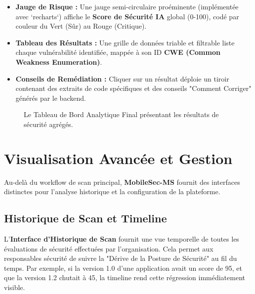 \documentclass[
  journal=largetwo,
  manuscript=article-type,
  year=2025,
  volume=1,
]{cup-journal}
\begin{document}
\begin{itemize}
    \item \textbf{Jauge de Risque :} Une jauge semi-circulaire proéminente (implémentée avec `recharts`) affiche le \textbf{Score de Sécurité IA} global (0-100), codé par couleur du Vert (Sûr) au Rouge (Critique).
    \item \textbf{Tableau des Résultats :} Une grille de données triable et filtrable liste chaque vulnérabilité identifiée, mappée à son ID \textbf{CWE (Common Weakness Enumeration)}.
    \item \textbf{Conseils de Remédiation :} Cliquer sur un résultat déploie un tiroir contenant des extraits de code spécifiques et des conseils "Comment Corriger" générés par le backend.
\end{itemize}

\begin{figure}
\centering
{}
\caption{Le Tableau de Bord Analytique Final présentant les résultats de sécurité agrégés.}
\label{fig:dashboard_full}
\end{figure}

\section{Visualisation Avancée et Gestion}
\label{sec:advanced_vis}

Au-delà du workflow de scan principal, \textbf{MobileSec-MS} fournit des interfaces distinctes pour l'analyse historique et la configuration de la plateforme.

\subsection{Historique de Scan et Timeline}
L'\textbf{Interface d'Historique de Scan} fournit une vue temporelle de toutes les évaluations de sécurité effectuées par l'organisation. Cela permet aux responsables sécurité de suivre la "Dérive de la Posture de Sécurité" au fil du temps. Par exemple, si la version 1.0 d'une application avait un score de 95, et que la version 1.2 chutait à 45, la timeline rend cette régression immédiatement visible.
\end{document}
